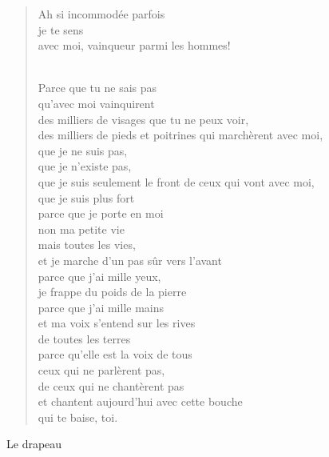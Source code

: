 \documentclass[11pt,a4paper]{book}
\begin{document}
\begin{verse}
Ah si incommodée parfois \\
je te sens \\
avec moi, vainqueur parmi les hommes! \\ \

Parce que tu ne sais pas \\
qu'avec moi vainquirent \\
des milliers de visages que tu ne peux voir, \\
des milliers de pieds et poitrines qui marchèrent avec moi, \\
que je ne suis pas, \\
que je n'existe pas, \\
que je suis seulement le front de ceux qui vont avec moi, \\
que je suis plus fort \\
parce que je porte en moi \\
non ma petite vie \\
mais toutes les vies, \\
et je marche d'un pas sûr vers l'avant \\
parce que j'ai mille yeux, \\
je frappe du poids de la pierre \\
parce que j'ai mille mains \\
et ma voix s'entend sur les rives \\
de toutes les terres \\
parce qu'elle est la voix de tous \\
ceux qui ne parlèrent pas, \\
de ceux qui ne chantèrent pas \\
et chantent aujourd'hui avec cette bouche \\
qui te baise, toi.
\end{verse}

\newpage

{\huge Le drapeau} \\ \\
\end{document}
